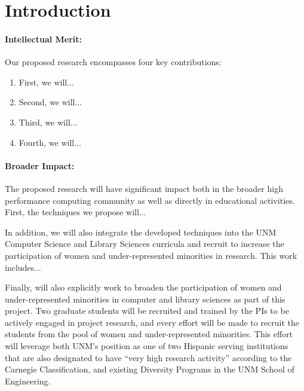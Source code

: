 \section{Introduction}
\label{sec:intro}

\paragraph{Intellectual Merit:} Our proposed research encompasses four key contributions:
\begin{enumerate}
\item First, we will...
\item Second, we will...
\item Third, we will...
\item Fourth, we will...
\end{enumerate}

\paragraph{Broader Impact:} The proposed research will have significant impact
both in the broader high performance computing community as well as directly
in educational activities. First, the techniques we propose will...

In addition, we will also integrate the developed techniques into the UNM
Computer Science and Library Sciences curricula and recruit to increase the 
participation of women and under-represented minorities in research. This work includes...

Finally, will also explicitly work to broaden the participation of women and under-represented
minorities in computer and library sciences as part of this project. Two
graduate students will be recruited and trained by the PIs to be actively engaged
in project research, and every effort will be made to recruit the students
from the pool of women and under-represented minorities. This effort  will
leverage both UNM's position as one of two Hispanic serving institutions that are also designated
to have ``very high research activity'' according to the Carnegie Classification, and 
existing Diversity Programs in the UNM School of Engineering.
